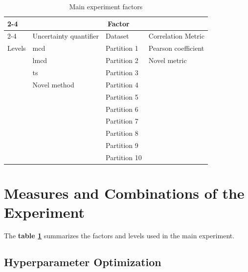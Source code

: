\begin{table}[ht]
	\caption{Main experiment factors}
	\label{tab:main_exp}
	\begin{center}
		\begin{tabular}{|l|l|l|l|}
			\cline{2-4}
			\multicolumn{1}{c|}{} & \multicolumn{3}{c|}{Factor}                                      \\
			\cline{2-4}
			\multicolumn{1}{c|}{} & Uncertainty quantifier      & Dataset      & Correlation Metric  \\ \hline
			Levels
			                      & \acrfull{mcd}               & Partition 1  & Pearson coefficient \\
			                      & \acrfull{lmcd}              & Partition 2  & Novel metric        \\
			                      & \acrfull{ts}                & Partition 3  &                     \\
			                      & Novel method                & Partition 4  &                     \\
			                      &                             & Partition 5  &                     \\
			                      &                             & Partition 6  &                     \\
			                      &                             & Partition 7  &                     \\
			                      &                             & Partition 8  &                     \\
			                      &                             & Partition 9  &                     \\
			                      &                             & Partition 10 &                     \\\hline
		\end{tabular}
	\end{center}
\end{table}

\section{Measures and Combinations of the Experiment}
The \textbf{table \ref{tab:main_exp}} summarizes the factors and levels used in the main experiment.



\subsection{Hyperparameter Optimization}

